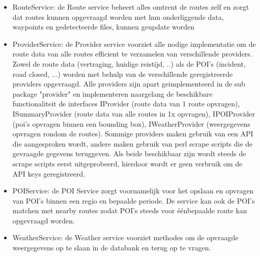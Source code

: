 \begin{itemize}
\begin{itemize}
  	\begin{itemize}
    \item RouteService: de Route service beheert alles omtrent de routes zelf en zorgt dat routes kunnen opgevraagd worden met hun onderliggende data, waypoints en gedetecteerde files, kunnen geupdate worden
    
    \item ProviderService: de Provider service voorziet alle nodige implementatie om de route data van alle routes efficient te verzamelen van verschillende providers. Zowel de route data (vertraging, huidige reistijd, ..) als de POI's (incident, road closed, ...) worden met behulp van de verschillende geregistreerde providers opgevraagd. Alle providers zijn apart geimplementeerd in de sub package "provider" en implementeren naargelang de beschikbare functionaliteit de interfaces IProvider (route data van 1 route opvragen), ISummaryProvider (route data van alle routes in 1x opvragen), IPOIProvider (poi's opvragen binnen een bounding box), IWeatherProvider (weergegevens opvragen rondom de routes). Sommige providers maken gebruik van een API die aangesproken wordt, andere maken gebruik van perl scrape scripts die de gevraagde gegevens teruggeven. Als beide beschikbaar zijn wordt steeds de scrape scripts eerst uitgeprobeerd, hierdoor wordt er geen verbruik om de API keys geregistreerd.
    
    \item POIService: de POI Service zorgt voornamelijk voor het opslaan en opvragen van POI's binnen een regio en bepaalde periode. De service kan ook de POI's matchen met nearby routes zodat POI's steeds voor éénbepaalde route kan opgevraagd worden.
    
    \item WeatherService: de Weather service voorziet methodes om de opvraagde weergegevens op te slaan in de databank en terug op te vragen.
    \end{itemize}
  

\end{itemize}
\end{itemize}
